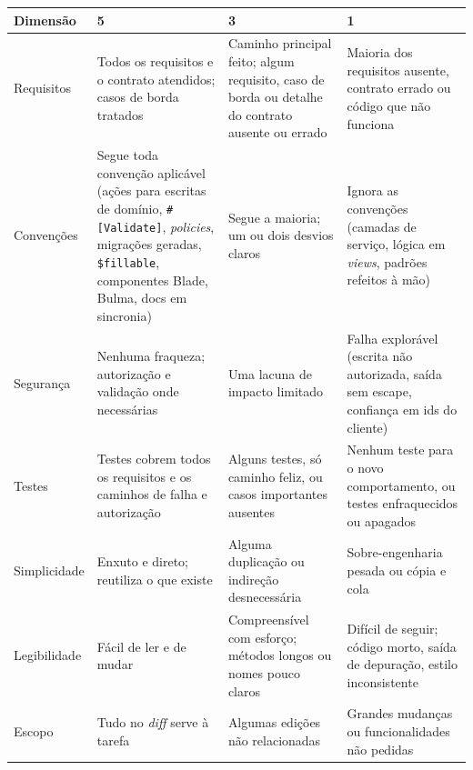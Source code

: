\begin{quadro}[htb]
    \centering
    \ABNTEXfontereduzida
    \caption{\label{qdr:rubrica}Dimensões da rubrica e âncoras das notas 5, 3 e 1}
    \begin{tabular}{|p{2.3cm}|p{4.2cm}|p{3.4cm}|p{4.0cm}|}
        \hline
        \textbf{Dimensão} & \textbf{5} & \textbf{3} & \textbf{1} \\
        \hline
        Requisitos & Todos os requisitos e o contrato atendidos; casos de borda tratados & Caminho principal feito; algum requisito, caso de borda ou detalhe do contrato ausente ou errado & Maioria dos requisitos ausente, contrato errado ou código que não funciona \\
        \hline
        Convenções & Segue toda convenção aplicável (ações para escritas de domínio, \texttt{\#[Validate]}, \textit{policies}, migrações geradas, \texttt{\$fillable}, componentes Blade, Bulma, docs em sincronia) & Segue a maioria; um ou dois desvios claros & Ignora as convenções (camadas de serviço, lógica em \textit{views}, padrões refeitos à mão) \\
        \hline
        Segurança & Nenhuma fraqueza; autorização e validação onde necessárias & Uma lacuna de impacto limitado & Falha explorável (escrita não autorizada, saída sem escape, confiança em ids do cliente) \\
        \hline
        Testes & Testes cobrem todos os requisitos e os caminhos de falha e autorização & Alguns testes, só caminho feliz, ou casos importantes ausentes & Nenhum teste para o novo comportamento, ou testes enfraquecidos ou apagados \\
        \hline
        Simplicidade & Enxuto e direto; reutiliza o que existe & Alguma duplicação ou indireção desnecessária & Sobre-engenharia pesada ou cópia e cola \\
        \hline
        Legibilidade & Fácil de ler e de mudar & Compreensível com esforço; métodos longos ou nomes pouco claros & Difícil de seguir; código morto, saída de depuração, estilo inconsistente \\
        \hline
        Escopo & Tudo no \textit{diff} serve à tarefa & Algumas edições não relacionadas & Grandes mudanças ou funcionalidades não pedidas \\
        \hline
    \end{tabular}
    \fonteautor
\end{quadro}
